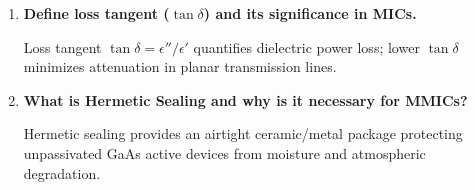 \documentclass[10pt,a4paper]{article}
\newcommand{\Q}[1]{\textbf{#1}\par\vspace{2pt}}
\begin{document}
\begin{tcolorbox}[exambox, title={\textbf{Frequently Asked / Viva Questions}}]
\begin{enumerate}[topsep=0pt, label=\textbf{Q\arabic*.}, itemsep=5pt]
    \item \Q{Define loss tangent ($\tan\delta$) and its significance in MICs.}
    Loss tangent $\tan\delta = \epsilon'' / \epsilon'$ quantifies dielectric power loss; lower $\tan\delta$ minimizes attenuation in planar transmission lines.

    \item \Q{What is Hermetic Sealing and why is it necessary for MMICs?}
    Hermetic sealing provides an airtight ceramic/metal package protecting unpassivated GaAs active devices from moisture and atmospheric degradation.
  \end{enumerate}
\end{tcolorbox}
\end{document}
